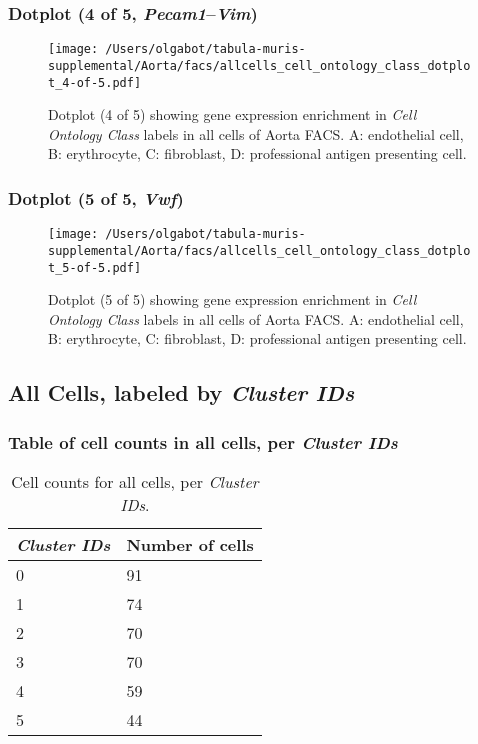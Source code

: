 \subsubsection{Dotplot (4 of 5, \emph{Pecam1}--\emph{Vim})}
\begin{figure}[h]
\centering
\texttt{[image: /Users/olgabot/tabula-muris-supplemental/Aorta/facs/allcells\_cell\_ontology\_class\_dotplot\_4-of-5.pdf]}

\caption{ Dotplot (4 of 5)  showing gene expression enrichment in \emph{Cell Ontology Class} labels in all cells of Aorta FACS. A: endothelial cell, B: erythrocyte, C: fibroblast, D: professional antigen presenting cell.}
\end{figure}


\clearpage

\subsubsection{Dotplot (5 of 5, \emph{Vwf})}
\begin{figure}[h]
\centering
\texttt{[image: /Users/olgabot/tabula-muris-supplemental/Aorta/facs/allcells\_cell\_ontology\_class\_dotplot\_5-of-5.pdf]}

\caption{ Dotplot (5 of 5)  showing gene expression enrichment in \emph{Cell Ontology Class} labels in all cells of Aorta FACS. A: endothelial cell, B: erythrocyte, C: fibroblast, D: professional antigen presenting cell.}
\end{figure}


\clearpage

\subsection{All Cells, labeled by \emph{Cluster IDs}}
\subsubsection{Table of cell counts in all cells, per \emph{Cluster IDs}}\begin{table}[h]
\centering
\label{my-label}
\begin{tabular}{@{}ll@{}}
\toprule

\emph{Cluster IDs}& Number of cells \\ \midrule
0 & 91 \\

1 & 74 \\

2 & 70 \\

3 & 70 \\

4 & 59 \\

5 & 44 \\
\bottomrule
\end{tabular}
\caption{Cell counts for all cells, per \emph{Cluster IDs}.}
\end{table}

